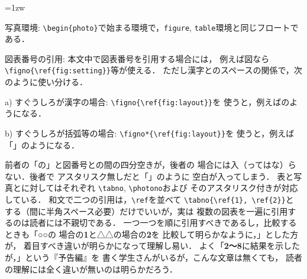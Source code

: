 \documentclass[onecolumn]{jsce}  %
\begin{document}
\begin{Description}
\parindent=1zw
%
\item[写真環境:] \verb+\begin{photo}+で始まる環境で，{\tt figure},
 {\tt table}環境と同じフロートである．
%
\item[図表番号の引用:] 本文中で図表番号を引用する場合には，
例えば図なら \verb+\figno{\ref{fig:setting}}+等が使える．
ただし漢字とのスペースの関係で，次のように使い分ける．
\begin{Description}
\item[a) すぐうしろが漢字の場合:] \verb+\figno{\ref{fig:layout}}+を
使うと，例えば\figno{\ref{fig:layout}}のようになる．
\item[b) すぐうしろが括弧等の場合:] \verb+\figno*{\ref{fig:layout}}+を
使うと，例えば「\figno*{\ref{fig:layout}}」のようになる．
\end{Description}
前者の「の」と図番号との間の四分空きが，後者の
場合には入（ってはな）らない．後者で
アスタリスク無しだと「\figno{\ref{fig:layout}}」のように
空白が入ってしまう．
表と写真とに対してはそれぞれ \verb+\tabno+, \verb+\photono+および
そのアスタリスク付きが対応している．
和文で二つの引用は，\verb+\ref+を並べて \verb+\tabno{\ref{1}, \ref{2}}+と
する（間に半角スペース必要）だけでいいが，実は
複数の図表を一遍に引用するのは読者には不親切である．
一つ一つを順に引用すべきであるし，比較するときも「○○の
場合の{\bf \figurename1}と△△の場合の{\bf \figurename2}を
比較して明らかなように，」とした方が，
着目すべき違いが明らかになって理解し易い．
よく「{\bf \figurename 2〜8}に結果を示したが，」という『予告編』を
書く学生さんがいるが，こんな文章は無くても，
読者の理解には全く違いが無いのは明らかだろう．


\end{Description}
\end{document}
